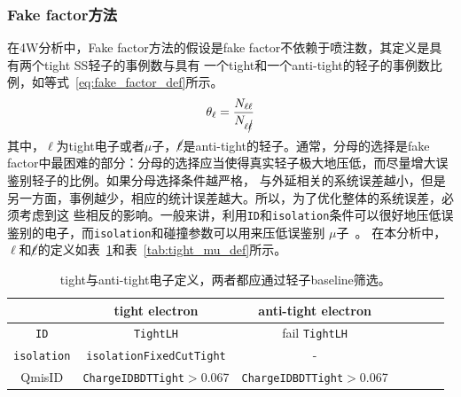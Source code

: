 \subsubsection{Fake factor方法}
在4W分析中，Fake factor方法的假设是fake factor不依赖于喷注数，其定义是具有两个tight SS轻子的事例数与具有
一个tight和一个anti-tight的轻子的事例数比例，如等式~\ref{eq:fake_factor_def}所示。
\begin{equation}
\theta_{\ell}=\frac{N_{\ell \ell}}{N_{\ell \cancel{\ell}}}
\label{eq:fake_factor_def}
\end{equation}
其中，$\ell$为tight电子或者$\mu$子，$\cancel{\ell}$是anti-tight的轻子。通常，分母的选择是fake 
factor中最困难的部分：分母的选择应当使得真实轻子极大地压低，而尽量增大误鉴别轻子的比例。如果分母选择条件越严格，
与外延相关的系统误差越小，但是另一方面，事例越少，相应的统计误差越大。所以，为了优化整体的系统误差，必须考虑到这
些相反的影响。一般来讲，利用\texttt{ID}和\texttt{isolation}条件可以很好地压低误鉴别的电子，而\texttt{isolation}和碰撞参数可以用来压低误鉴别
$\mu$子~\cite{Alison2015}。
在本分析中，$\ell$和$\cancel{\ell}$的定义如表~\ref{tab:tight_ele_def}和表~\ref{tab:tight_mu_def}所示。
\begin{table}[!ht]
\begin{center}
\begin{tabular}{c|cccccc}
\hline
  &tight electron    &anti-tight electron  \\
\hline
\texttt{ID}  &\texttt{TightLH}  &fail \texttt{TightLH} \\
\texttt{isolation} &\texttt{isolationFixedCutTight}  &- \\
QmisID          &\texttt{ChargeIDBDTTight}$>$0.067  &\texttt{ChargeIDBDTTight}$>$0.067 \\
\hline
\end{tabular}
\caption{tight与anti-tight电子定义，两者都应通过轻子baseline筛选。}
\label{tab:tight_ele_def}
\end{center}
\end{table}

